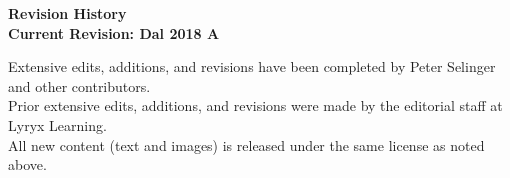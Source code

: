 \thispagestyle{plain}


\setlength{\parskip}{0pt}

\begin{center}
  \fontsize{14pt}{16pt}\selectfont\textcolor{titletextcolour}{\textbf{Revision History \\ \smallskip  Current Revision: Dal 2018 A}}
\end{center}

{\footnotesize

  \begin{center}
    Extensive edits, additions, and revisions have been completed by
    Peter Selinger and other contributors. \\
    Prior extensive edits, additions, and revisions were made by the
    editorial staff at Lyryx Learning. \\
    All new content (text and images) is released under the same
    license as noted above.
  \end{center}

}
